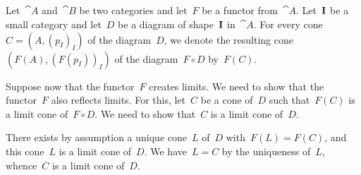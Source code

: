 \subsection{}

Let~$\cat{A}$ and~$\cat{B}$ be two categories and let~$F$ be a functor from~$\cat{A}$.
Let~$\mathbf{I}$ be a small category and let~$D$ be a diagram of shape~$\mathbf{I}$ in~$\cat{A}$.
For every cone~$C = (A, (p_I)_I)$ of the diagram~$D$, we denote the resulting cone~$(F(A), (F(p_I))_I)$ of the diagram~$F ∘ D$ by~$F(C)$.

Suppose now that the functor~$F$ creates limits.
We need to show that the functor~$F$ also reflects limits.
For this, let~$C$ be a cone of~$D$ such that~$F(C)$ is a limit cone of~$F ∘ D$.
We need to show that~$C$ is a limit cone of~$D$.

There exists by assumption a unique cone~$L$ of~$D$ with~$F(L) = F(C)$, and this cone~$L$ is a limit cone of~$D$.
We have~$L = C$ by the uniqueness of~$L$, whence~$C$ is a limit cone of~$D$.

